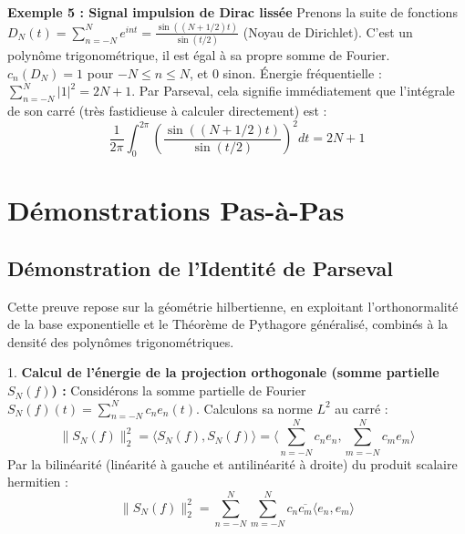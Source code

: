 \documentclass[11pt,a4paper]{article}
\begin{document}
\textbf{Exemple 5 : Signal impulsion de Dirac lissée}
Prenons la suite de fonctions $D_N(t) = \sum_{n=-N}^N e^{int} = \frac{\sin((N+1/2)t)}{\sin(t/2)}$ (Noyau de Dirichlet).
C'est un polynôme trigonométrique, il est égal à sa propre somme de Fourier.
$c_n(D_N) = 1$ pour $-N \le n \le N$, et $0$ sinon.
Énergie fréquentielle : $\sum_{n=-N}^N |1|^2 = 2N + 1$.
Par Parseval, cela signifie immédiatement que l'intégrale de son carré (très fastidieuse à calculer directement) est :
$$\frac{1}{2\pi} \int_0^{2\pi} \left( \frac{\sin((N+1/2)t)}{\sin(t/2)} \right)^2 dt = 2N + 1$$



\begin{center}
\end{center}

\section{Démonstrations Pas-à-Pas}


\subsection{Démonstration de l'Identité de Parseval}


Cette preuve repose sur la géométrie hilbertienne, en exploitant l'orthonormalité de la base exponentielle et le Théorème de Pythagore généralisé, combinés à la densité des polynômes trigonométriques.

1. \textbf{Calcul de l'énergie de la projection orthogonale (somme partielle $S_N(f)$) :}
   Considérons la somme partielle de Fourier $S_N(f)(t) = \sum_{n=-N}^N c_n e_n(t)$.
   Calculons sa norme $L^2$ au carré :
   $$\|S_N(f)\|_2^2 = \langle S_N(f), S_N(f) \rangle = \langle \sum_{n=-N}^N c_n e_n, \sum_{m=-N}^N c_m e_m \rangle$$
   Par la bilinéarité (linéarité à gauche et antilinéarité à droite) du produit scalaire hermitien :
   $$\|S_N(f)\|_2^2 = \sum_{n=-N}^N \sum_{m=-N}^N c_n \overline{c_m} \langle e_n, e_m \rangle$$
\end{document}
